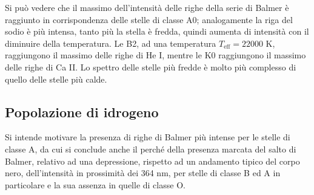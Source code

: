 \documentclass[11pt, a4paper]{scrartcl}
\theoremstyle{style}
\theoremstyle{style1}
\numberwithin{equation}{subsection}
\begin{document}
Si pu\`o vedere che il massimo dell'intensit\`a delle righe della serie di Balmer \`e raggiunto in corrispondenza delle stelle di classe A0; analogamente la riga del sodio \`e pi\`u intensa, tanto pi\`u la stella \`e fredda, quindi aumenta di intensit\`a con il diminuire della temperatura.
Le B2, ad una temperatura $T_\text{eff} = 22000$ K, raggiungono il massimo delle righe di He I, mentre le K0 raggiungono il massimo delle righe di Ca II.
Lo spettro delle stelle pi\`u fredde \`e molto pi\`u complesso di quello delle stelle pi\`u calde.
\subsection{Popolazione di idrogeno}

Si intende motivare la presenza di righe di Balmer pi\`u intense per le stelle di classe A, da cui si conclude anche il perch\'e della presenza marcata del salto di Balmer, relativo ad una depressione, rispetto ad un andamento tipico del corpo nero, dell'intensit\`a in prossimit\`a dei 364 nm, per stelle di classe B ed A in particolare e la sua assenza in quelle di classe O.
\end{document}
